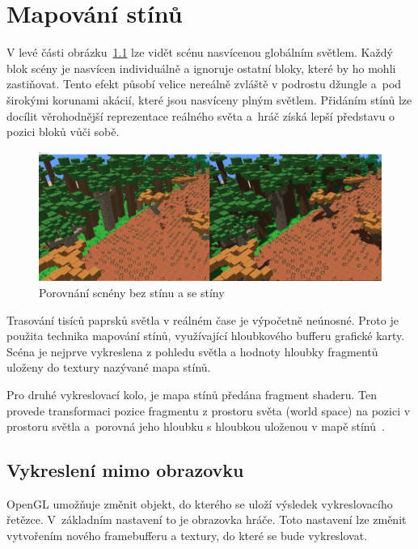 \documentclass[thesis=M,czech]{FITthesis}[2019/12/23]
\begin{document}

\chapter{Mapování stínů}

V levé části obrázku~\ref{fig:shadows_intro} lze vidět scénu nasvícenou globálním světlem. Každý blok scény je nasvícen individuálně a ignoruje ostatní bloky, které by ho mohli zastiňovat. Tento efekt působí velice nereálně zvláště v podrostu džungle a~pod širokými korunami akácií, které jsou nasvíceny plným světlem. Přidáním stínů lze docílit věrohodnější reprezentace reálného světa a~hráč získá lepší představu o pozici bloků vůči sobě.

\begin{figure}\centering
	\includegraphics[width=\textwidth]{images/shadows/intro}
	\caption[Porovnání scnény bez stínu a se stíny]{Porovnání scnény bez stínu a se stíny}\label{fig:shadows_intro}
\end{figure}

Trasování tisíců paprsků světla v reálném čase je výpočetně neúnosné. Proto je použita technika mapování stínů, využívající hloubkového bufferu grafické karty. Scéna je nejprve vykreslena z pohledu světla a hodnoty hloubky fragmentů uloženy do textury nazývané mapa stínů.

Pro druhé vykreslovací kolo, je mapa stínů předána fragment shaderu. Ten provede transformaci pozice fragmentu z prostoru světa (world space) na pozici v prostoru světla a~porovná jeho hloubku s hloubkou uloženou v mapě stínů~\cite{lopgl_shadows}.

\section{Vykreslení mimo obrazovku}

OpenGL umožňuje změnit objekt, do kterého se uloží výsledek vykreslovacího řetězce. V~základním nastavení to je obrazovka hráče. Toto nastavení lze změnit vytvořením nového framebufferu a textury, do které se bude vykreslovat.
\end{document}
